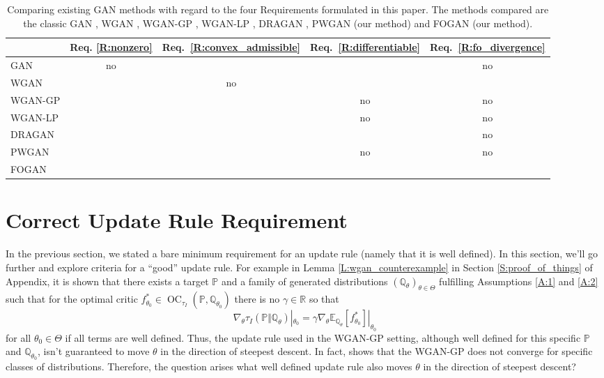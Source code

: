 \documentclass{article}
\DeclareMathOperator{\oc}{OC}
\begin{document}
\begin{table}
\newcommand{\nox}{\textcolor{red!70!black}{no}}\newcommand{\yescheck}{\textcolor{green!50!black}{\checkmark}}
\centering
  \caption{Comparing existing GAN methods with regard to the four Requirements formulated in this paper.
  The methods compared are the classic GAN \cite{goodfellow2014generative},
  WGAN \cite{arjovsky2017wasserstein}, WGAN-GP \cite{gulrajani2017improved},
  WGAN-LP \cite{petzka2017regularization}, DRAGAN \cite{dragan}, PWGAN (our method) and FOGAN (our method).
  }\label{Ta:whats_what}
  \begin{tabular}{lcccc}\toprule
  & Req. \ref{R:nonzero} & Req.\ \ref{R:convex_admissible} & Req.\ \ref{R:differentiable} & Req.\ \ref{R:fo_divergence} \tabularnewline \midrule
   GAN & \nox & \yescheck & \yescheck & \nox \tabularnewline
   WGAN & \yescheck & \nox & \yescheck & \yescheck \tabularnewline
   WGAN-GP & \yescheck & \yescheck & \nox & \nox \tabularnewline
   WGAN-LP & \yescheck & \yescheck & \nox & \nox \tabularnewline
   DRAGAN & \yescheck & \yescheck & \yescheck & \nox  \tabularnewline
   PWGAN & \yescheck & \yescheck & \nox & \nox  \tabularnewline
   FOGAN & \yescheck & \yescheck & \yescheck & \yescheck \tabularnewline \bottomrule
  \end{tabular}
 \end{table}

 \section{Correct Update Rule Requirement}\label{S:update_rule}

 In the previous section, we stated a bare minimum requirement for an update rule (namely that it is well defined). In this section, we'll go further
 and explore criteria for a ``good'' update rule. For example in Lemma \ref{L:wgan_counterexample} in Section \ref{S:proof_of_things} of Appendix,
 it is shown that there exists a target $\mathbb P$ and
 a family of generated distributions $(\mathbb Q_\theta)_{\theta\in\Theta}$ fulfilling Assumptions \ref{A:1} and \ref{A:2} such that for the optimal critic
 $f_{\theta_0}^*\in\oc_{\tau_I}(\mathbb P,\mathbb Q_{\theta_0})$ there is no $\gamma\in\mathbb R$ so that
 \[\nabla_\theta\tau_I(\mathbb P\Vert\mathbb Q_\theta)|_{\theta_0}=\gamma\nabla_\theta\mathbb E_{\mathbb Q_\theta}[f_{\theta_0}^*]|_{\theta_0}\]
 for all $\theta_0\in\Theta$
 if all terms are well defined.
 Thus, the update rule used in the WGAN-GP setting, although well defined for this specific $\mathbb P$ and $\mathbb Q_{\theta_0}$,
 isn't guaranteed to move $\theta$ in the direction of steepest descent. In fact, \cite{mescheder2018which} shows that
 the WGAN-GP does not converge for specific classes of distributions.
 Therefore, the question arises what well defined update rule also moves $\theta$ in the direction of steepest descent?
\end{document}
